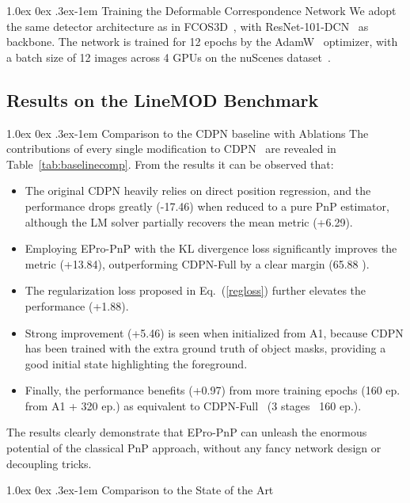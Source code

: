 \documentclass[10pt,twocolumn,letterpaper]{article}
\makeatletter
\renewcommand{\paragraph}{
  \@startsection{paragraph}{4}
  {\z@}{1.0ex \@plus 0ex \@minus .3ex}{-1em}
  {\normalfont\normalsize\bfseries}
}
\makeatother
\begin{document}
\paragraph{Training the Deformable Correspondence Network} We adopt the same detector architecture as in FCOS3D~\cite{fcos3d}, with ResNet-101-DCN~\cite{dcn} as backbone.
The network is trained for 12 epochs by the AdamW~\cite{adamw} optimizer, with a batch size of 12 images across 4 GPUs on the nuScenes dataset~\cite{nuscenes}.

\subsection{Results on the LineMOD Benchmark}

\paragraph{Comparison to the CDPN baseline with Ablations}
The contributions of every single modification to CDPN~\cite{CDPN} are revealed in Table~\ref{tab:baselinecomp}. 
From the results it can be observed that:
\begin{itemize}[noitemsep,topsep=0.7ex,partopsep=0.7ex]
\item The original CDPN heavily relies on direct position regression, and the performance drops greatly (-17.46) when reduced to a pure PnP estimator, although the LM solver partially recovers the mean metric (+6.29). 
\item Employing EPro-PnP with the KL divergence loss significantly improves the metric (+13.84), outperforming CDPN-Full by a clear margin (65.88 ). 
\item The regularization loss proposed in Eq.~(\ref{regloss}) further elevates the performance (+1.88). 
\item Strong improvement (+5.46) is seen when initialized from A1, because CDPN has been trained with the extra ground truth of object masks, providing a good initial state highlighting the foreground.
\item Finally, the performance benefits (+0.97) from more training epochs (160 ep. from A1 + 320 ep.) as equivalent to CDPN-Full~\cite{CDPN} (3 stages \texttimes\ 160 ep.).
\end{itemize}
The results clearly demonstrate that EPro-PnP can unleash the enormous potential of the classical PnP approach, without any fancy network design or decoupling tricks. 

\paragraph{Comparison to the State of the Art}
\end{document}
